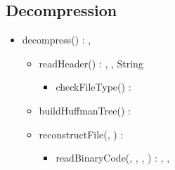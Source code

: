 \subsection{Decompression}


\begin{itemize}
    \item decompress(\binaryFile) : \binaryFile, \booleen
    \begin{itemize}
        \item readHeader(\binaryFile) : \statistics, \naturel, String
        \begin{itemize}
            \item checkFileType(\binaryFile) : \booleen
        \end{itemize}
        \item buildHuffmanTree(\statistics) : \huffmanTree
        \item reconstructFile(\binaryFile, \huffmanTree) : \binaryFile
        \begin{itemize}
            \item readBinaryCode(\binaryFile, \naturel, \byte, \huffmanTree) : \byte, \byte, \naturel
        \end{itemize}
    \end{itemize}
\end{itemize}
